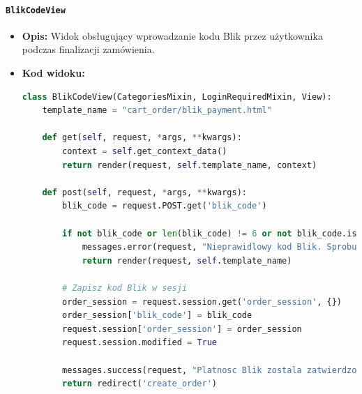 \documentclass[12pt,a4paper,oneside]{article}
\theoremstyle{definition}
\numberwithin{equation}{section}
\begin{document}
\paragraph{\texttt{BlikCodeView}}
\begin{itemize}
    \item \textbf{Opis:} Widok obsługujący wprowadzanie kodu Blik przez użytkownika podczas finalizacji zamówienia.
    \item \textbf{Kod widoku:}
\begin{lstlisting}[language=Python, caption=Kod widoku BlikCodeView]
class BlikCodeView(CategoriesMixin, LoginRequiredMixin, View):
    template_name = "cart_order/blik_payment.html"

    def get(self, request, *args, **kwargs):
        context = self.get_context_data()
        return render(request, self.template_name, context)

    def post(self, request, *args, **kwargs):
        blik_code = request.POST.get('blik_code')

        if not blik_code or len(blik_code) != 6 or not blik_code.isdigit():
            messages.error(request, "Nieprawidlowy kod Blik. Sprobuj ponownie.")
            return render(request, self.template_name)

        # Zapisz kod Blik w sesji
        order_session = request.session.get('order_session', {})
        order_session['blik_code'] = blik_code
        request.session['order_session'] = order_session
        request.session.modified = True

        messages.success(request, "Platnosc Blik zostala zatwierdzona.")
        return redirect('create_order')
\end{lstlisting}


\end{itemize}
\end{document}
